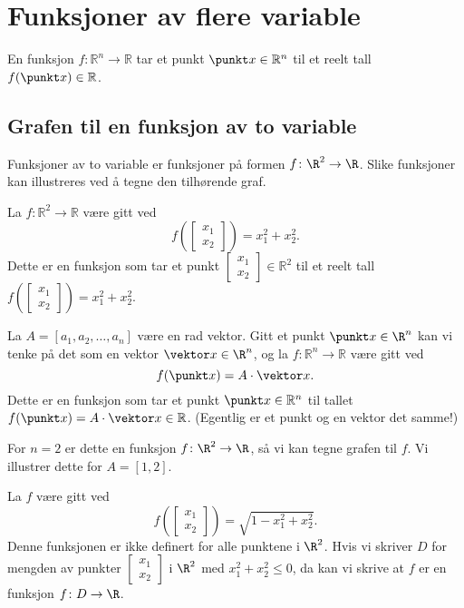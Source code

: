 \section{Funksjoner av flere variable}

En funksjon $f: \mathbb{R}^n \to \mathbb{R}$ tar et punkt $\punkt x \in \mathbb{R}^n$
til et reelt tall $f(\punkt x) \in \mathbb{R}$. 

\subsection{Grafen til en funksjon av to variable}
Funksjoner av to variable er funksjoner på formen $f \colon \R^2 \to \R$. Slike
funksjoner kan illustreres ved å tegne den tilhørende graf.

\begin{eksempel}
  La $f: \mathbb{R}^2 \to \mathbb{R}$ være gitt ved
  $$f(\begin{bmatrix} x_1 \\ x_2 \end{bmatrix}) = x_1^2 + x_2^2.$$
  Dette er en funksjon som tar et punkt $\begin{bmatrix} x_1 \\ x_2
  \end{bmatrix} \in \mathbb{R}^2$ til et reelt tall
  $f(\begin{bmatrix} x_1 \\ x_2 \end{bmatrix}) = x_1^2 + x_2^2.$
\end{eksempel}

\begin{eksempel}
  La $A = [a_1, a_2, \dots, a_n]$ være en rad vektor. 
  Gitt et punkt $\punkt x \in \R^n$ kan vi
  tenke på det som en vektor $\vektor x \in \R^n$, og la $f: \mathbb{R}^n \to \mathbb{R}$ være gitt ved
  $$f(\punkt x) = A\cdot \vektor x.$$
  Dette er en funksjon som tar et punkt $\punkt x \in \mathbb{R}^n$ til tallet
  $f(\punkt x) = A\cdot \vektor x \in \mathbb{R}$.
  (Egentlig er et punkt og en vektor det samme!)

  For $n = 2$ er dette en funksjon $f \colon \R^2 \to \R$, så vi kan tegne grafen til $f$.
  Vi illustrer dette for $A = [1, 2]$.
\end{eksempel}

\begin{eksempel}
  La $f$ være gitt ved
  $$f(\begin{bmatrix} x_1 \\ x_2 \end{bmatrix}) = \sqrt{1 - x_1^2 + x_2^2}.$$
  Denne funksjonen er ikke definert for alle punktene i $\R^2$. Hvis vi skriver 
  $D$ for mengden av punkter $\begin{bmatrix}x_1\\x_2\end{bmatrix}$ i $\R^2$
  med $x_1^2 + x_2^2 \le 0$, da kan vi skrive at $f$ er en funksjon $f \colon D \to \R$.
\end{eksempel}

